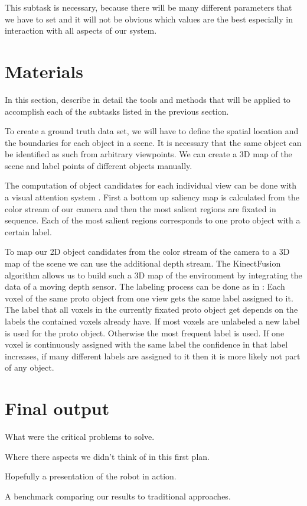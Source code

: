 \documentclass[a4paper,11pt,english]{article}
\begin{document}
This subtask is necessary, because there will be many different parameters that we have to set and it will not be obvious which values are the best especially in interaction with all aspects of our system.

\section{Materials}
In this section, describe in detail the tools and methods that will be applied to accomplish each of the subtasks listed in the previous section.\medskip

To create a ground truth data set, we will have to define the spatial location and the boundaries for each object in a scene.
It is necessary that the same object can be identified as such from arbitrary viewpoints.
We can create a 3D map of the scene and label points of different objects manually.

The computation of object candidates for each individual view can be done with a visual attention system \cite{garcia2013computational}.
First a bottom up saliency map is calculated from the color stream of our camera and then the most salient regions are fixated in sequence.
Each of the most salient regions corresponds to one proto object with a certain label.

To map our 2D object candidates from the color stream of the camera to a 3D map of the scene we can use the additional depth stream. The KinectFusion algorithm allows us to build such a 3D map of the environment by integrating the data of a moving depth sensor.
The labeling process can be done as in \cite{garcia2013computational}:
Each voxel of the same proto object from one view gets the same label assigned to it.
The label that all voxels in the currently fixated proto object get depends on the labels the contained voxels already have.
If most voxels are unlabeled a new label is used for the proto object.
Otherwise the most frequent label is used.
If one voxel is continuously assigned with the same label the confidence in that label increases, if many different labels are assigned to it then it is more likely not part of any object.

\section{Final output}
What were the critical problems to solve.

Where there aspects we didn't think of in this first plan.

Hopefully a presentation of the robot in action.

A benchmark comparing our results to traditional approaches. 




\end{document}
